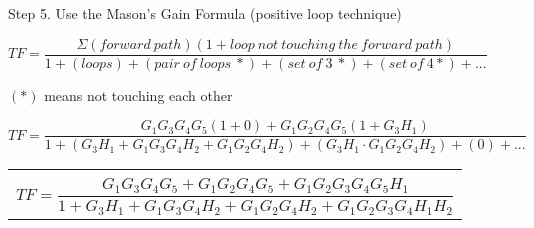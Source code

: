 \documentclass[11pt,letterpaper]{article}
\begin{document}
Step 5. Use the Mason’s Gain Formula (positive loop technique)\\
\begin{center}
	$TF=\dfrac{\Sigma (forward~path)(1 + loop~not~touching~the~forward~path)}{1 + (loops) + (pair~of~loops~*) + (set~of~3~*) + (set~of~4*) + ...}$
\end{center}
$(*)$ means not touching each other\\
\begin{center}
	$TF=\dfrac{G_1G_3G_4G_5(1+0)+G_1G_2G_4G_5(1+G_3H_1)}{1+(G_3H_1+G_1G_3G_4H_2+G_1G_2G_4H_2)+(G_3H_1\cdot G_1G_2G_4H_2)+(0)+...}$\\[12pt]
	\begin{tabular}{|c|}
		\hline \\
	$TF=\dfrac{G_1G_3G_4G_5+G_1G_2G_4G_5+G_1G_2G_3G_4G_5H_1}{1+G_3H_1+G_1G_3G_4H_2+G_1G_2G_4H_2+G_1G_2G_3G_4H_1H_2}$\\[12pt]
	\hline
	\end{tabular}
\end{center}
\end{document}
